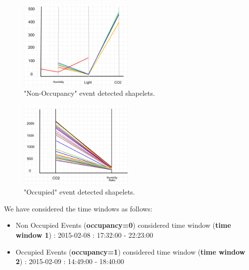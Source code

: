 \documentclass[conference]{IEEEtran}  %
\begin{document}
\begin{figure}
\includegraphics[width=0.5\textwidth]{Occupancy_event1.png}
\caption{"Non-Occupancy" event detected shapelets.}
\label{fig:occupancyEvent1}
\end{figure}

\begin{figure}
\includegraphics[width=0.5\textwidth]{Occupancy_event2.png}
\caption{"Occupied" event detected shapelets.}
\label{fig:occupancyEvent2}
\end{figure}


We have considered the time windows as follows:
\begin{itemize}
\item Non Occupied Events (\textbf{occupancy=0}) considered time window (\textbf{time window 1}) : 2015-02-08 : 17:32:00 - 22:23:00
\item Occupied Events (\textbf{occupancy=1}) considered time window (\textbf{time window 2}) : 2015-02-09 : 14:49:00 - 18:40:00
\end{itemize}
\end{document}
